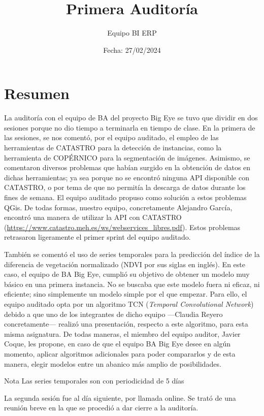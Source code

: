 \documentclass[12pt, a4paper]{article} %
\title{Primera Auditoría}
\author{Equipo BI ERP}
\date{Fecha: 27/02/2024}
\begin{document}
\maketitle

\section{Resumen}
La auditoría con el equipo de BA del proyecto Big Eye se tuvo que dividir en dos sesiones porque no dio tiempo a terminarla en tiempo de clase. En la primera de las sesiones, se nos comentó, por el equipo auditado, el empleo de las herramientas de CATASTRO para la detección de instancias, como la herramienta de COPÉRNICO para la segmentación de imágenes. Asimismo, se comentaron diversos problemas que habían surgido en la obtención de datos en dichas herramientas; ya sea porque no se encontró ninguna API disponible con CATASTRO, o por tema de que no permitía la descarga de datos durante los fines de semana. El equipo auditado propuso como solución a estos problemas QGis. De todas formas, nuestro equipo, concretamente Alejandro García, encontró una manera de utilizar la API con CATASTRO (\url{https://www.catastro.meh.es/ws/webservices_libres.pdf}). Estos problemas retrasaron ligeramente el primer sprint del equipo auditado. 

También se comentó el uso de series temporales para la predicción del índice de la diferencia de vegetación normalizado (NDVI por sus siglas en inglés). En este caso, el equipo de BA Big Eye, cumplió su objetivo de obtener un modelo muy básico en una primera instancia. No se buscaba que este modelo fuera ni eficaz, ni eficiente; sino simplemente un modelo simple por el que empezar. Para ello, el equipo auditado opta por un algoritmo TCN (\emph{Temporal Convolutional Network}) debido a que uno de los integrantes de dicho equipo ---Claudia Reyero concretamente--- realizó una presentación, respecto a este algoritmo, para esta misma asignatura. De todas maneras, el miembro del equipo auditor, Javier Coque, les propone, en caso de que el equipo BA Big Eye desee en algún momento, aplicar algoritmos adicionales para poder compararlos y de esta manera, elegir modelos entre un abanico más amplio de posibilidades.

\begin{ejemplo}{Nota}
    Las series temporales son con periodicidad de 5 días
\end{ejemplo}

La segunda sesión fue al día siguiente, por llamada online. Se trató de una reunión breve en la que se procedió a dar cierre a la auditoría. 
\end{document}
